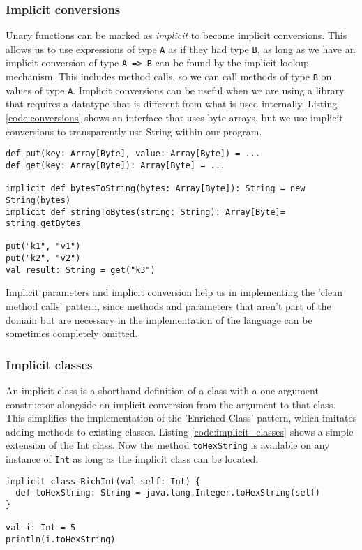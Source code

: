 \subsubsection{Implicit conversions}
Unary functions can be marked as {\it implicit} to become implicit conversions. This allows us to use expressions of type \texttt{A} as if they had type \texttt{B}, as long as we have an implicit conversion of type \texttt{A => B} can be found by the implicit lookup mechanism. This includes method calls, so we can call methods of type \texttt{B} on values of type \texttt{A}. Implicit conversions can be useful when we are using a library that requires a datatype that is different from what is used internally. Listing \ref{code:conversions} shows an interface that uses byte arrays, but we use implicit conversions to transparently use String within our program.

\begin{lstlisting}[caption=Implicit conversions, label=code:conversions, float]
def put(key: Array[Byte], value: Array[Byte]) = ...
def get(key: Array[Byte]): Array[Byte] = ...

implicit def bytesToString(bytes: Array[Byte]): String = new String(bytes)
implicit def stringToBytes(string: String): Array[Byte]= string.getBytes

put("k1", "v1")
put("k2", "v2")
val result: String = get("k3")
\end{lstlisting}

Implicit parameters and implicit conversion help us in implementing the 'clean method calls' pattern, since methods and parameters that aren't part of the domain but are necessary in the implementation of the language can be sometimes completely omitted.

\subsubsection{Implicit classes}
An implicit class is a shorthand definition of a class with a one-argument constructor alongside an implicit conversion from the argument to that class. This simplifies the implementation of the 'Enriched Class' pattern, which imitates adding methods to existing classes. Listing \ref{code:implicit_classes} shows a simple extension of the Int class. Now the method \texttt{toHexString} is available on any instance of \texttt{Int} as long as the implicit class can be located.

\begin{lstlisting}[caption=Implicit class, label=code:implicit_classes, float]
implicit class RichInt(val self: Int) {
  def toHexString: String = java.lang.Integer.toHexString(self)
}

val i: Int = 5
println(i.toHexString)
\end{lstlisting}

